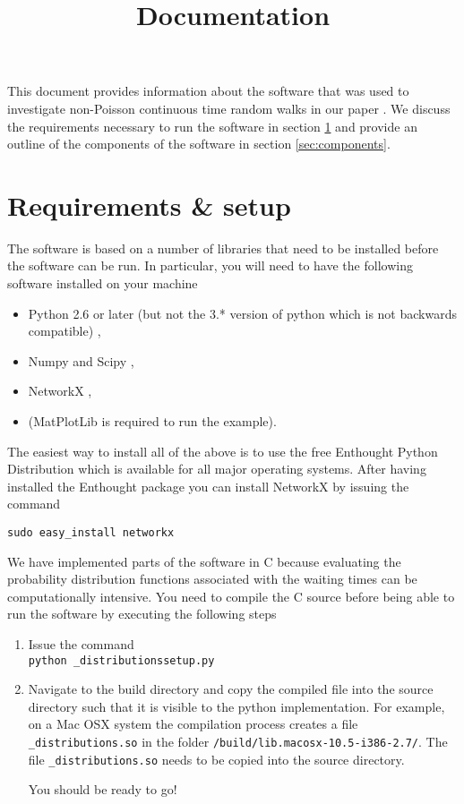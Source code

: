 \documentclass[twocolumn]{revtex4}
\begin{document}
\title{Documentation}
\maketitle

This document provides information about the software that was used to investigate non-Poisson continuous time random walks in our paper \cite{hoffmann}. We discuss the requirements necessary to run the software in section \ref{sec:requirements} and provide an outline of the components of the software in section \ref{sec:components}.
\section{Requirements \& setup}\label{sec:requirements}

The software is based on a number of libraries that need to be installed before the software can be run. In particular, you will need to have the following software installed on your machine
\begin{itemize}
	\item Python 2.6 or later (but not the 3.* version of python which is not backwards compatible) \cite{python},
	\item Numpy and Scipy \cite{scipy},
	\item NetworkX \cite{networkx},
	\item (MatPlotLib \cite{matplotlib} is required to run the example).
\end{itemize}

The easiest way to install all of the above is to use the free Enthought Python Distribution \cite{enthought} which is available for all major operating systems. After having installed the Enthought package you can install NetworkX by issuing the command
\begin{verbatim}
sudo easy_install networkx
\end{verbatim}

We have implemented parts of the software in C because evaluating the probability distribution functions associated with the waiting times can be computationally intensive. You need to compile the C source before being able to run the software by executing the following steps
\begin{enumerate}
	\item Issue the command \\{\tt python \_distributionssetup.py}
	\item Navigate to the build directory and copy the compiled file into the source directory such that it is visible to the python implementation. For example, on a Mac OSX system the compilation process creates a file {\tt \_distributions.so} in the folder {\tt <source directory>/build/lib.macosx-10.5-i386-2.7/}. The file {\tt \_distributions.so} needs to be copied into the source directory.
	
You should be ready to go!
\end{enumerate}
\end{document}
